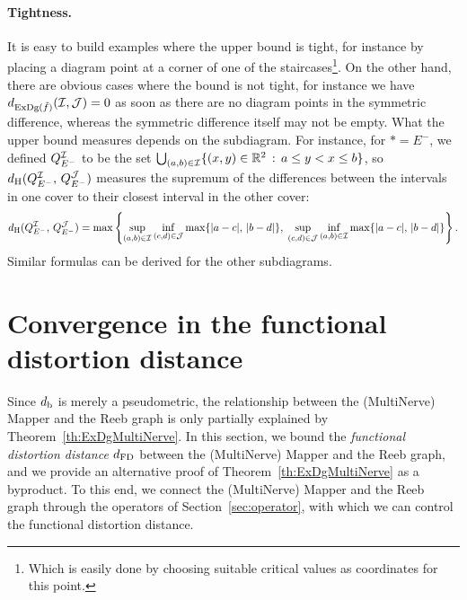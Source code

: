 \paragraph*{Tightness.} It is easy to build examples where the upper bound is tight, for
instance by placing a diagram point at a corner of one of the
staircases\footnote{Which is easily done by choosing suitable critical
  values as coordinates for this point.}. On the other hand, there are
obvious cases where the bound is not tight, for instance we have
$d_{\mathrm{ExDg}(\tilde f)}(\mathcal{I}, \mathcal{J}) = 0$ as soon as there are no diagram points
in the symmetric difference, whereas the symmetric difference itself
may not be empty.  What the upper bound measures depends on the
subdiagram. For instance, for $*=E^-$, we defined $Q_{E^-}^{\mathcal{I}}$ to be
the set $\bigcup_{(a,b)\in\mathcal{I}} \{(x,y)\in\mathbb{R}^2\,:\, a\leq y< x\leq b\}$,
so $d_{\rm H}(Q_{E^-}^{\mathcal{I}},\, Q_{E^-}^{\mathcal{J}})$ measures the supremum of
the differences between the intervals in one cover to their closest
interval in the other cover:
%
\[
d_{\rm H}(Q_{E^-}^{\mathcal{I}},\, Q_{E^-}^{\mathcal{J}}) = \max\left\{ \sup_{(a,b)\in\mathcal{I}} \inf_{(c,d)\in\mathcal{J}} 
\max\{|a-c|,\, |b-d|\},\; \sup_{(c,d)\in\mathcal{J}} \inf_{(a,b)\in\mathcal{I}} \max\{|a-c|,\, |b-d|\}\right\}.
\]
%
Similar formulas can be derived for the other subdiagrams.
%






















\section{Convergence in the functional distortion distance}
\label{sec:stabdfd}

Since $d_{\rm b}$ is merely a pseudometric, the relationship between the
(MultiNerve) Mapper and the Reeb graph is only partially explained by
Theorem~\ref{th:ExDgMultiNerve}.  In this section, we bound the 
{\em functional distortion distance} $d_{\rm FD}$ between the
(MultiNerve) Mapper and the Reeb graph, and we provide an alternative
proof of Theorem~\ref{th:ExDgMultiNerve} as a byproduct. %
To this end, we connect the (MultiNerve) Mapper and the Reeb graph through 
the operators of Section~\ref{sec:operator}, with which we can control the functional
distortion distance.



